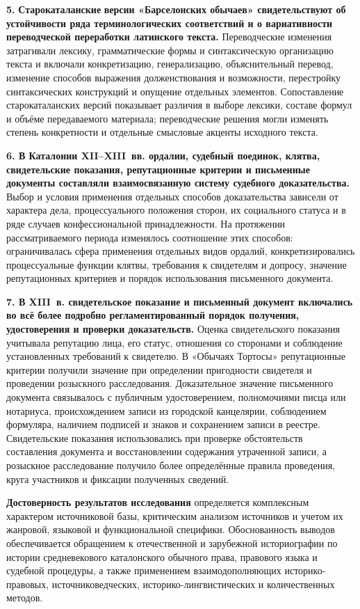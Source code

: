 \textbf{5. }\textbf{Старокаталанские}\textbf{ версии «Барселонских обычаев» свидетельствуют об устойчивости ряда терминологических соответствий и о вариативности переводческой переработки латинского текста. }Переводческие изменения затрагивали лексику, грамматические формы и синтаксическую организацию текста и включали конкретизацию, генерализацию, объяснительный перевод, изменение способов выражения долженствования и возможности, перестройку синтаксических конструкций и опущение отдельных элементов. Сопоставление старокаталанских версий показывает различия в выборе лексики, составе формул и объёме передаваемого материала; переводческие решения могли изменять степень конкретности и отдельные смысловые акценты исходного текста.

\textbf{6. В Каталонии XII--XIII~вв. ордалии, судебный поединок, клятва, свидетельские показания, репутационные критерии и письменные документы составляли взаимосвязанную систему судебного доказательства. }Выбор и условия применения отдельных способов доказательства зависели от характера дела, процессуального положения сторон, их социального статуса и в ряде случаев конфессиональной принадлежности. На протяжении рассматриваемого периода изменялось соотношение этих способов: ограничивалась сфера применения отдельных видов ордалий, конкретизировались процессуальные функции клятвы, требования к свидетелям и допросу, значение репутационных критериев и порядок использования письменного документа.

\textbf{7. В XIII~в. свидетельское показание и письменный документ включались во всё более подробно регламентированный порядок получения, удостоверения и проверки доказательств. }Оценка свидетельского показания учитывала репутацию лица, его статус, отношения со сторонами и соблюдение установленных требований к свидетелю. В «Обычаях Тортосы» репутационные критерии получили значение при определении пригодности свидетеля и проведении розыскного расследования. Доказательное значение письменного документа связывалось с публичным удостоверением, полномочиями писца или нотариуса, происхождением записи из городской канцелярии, соблюдением формуляра, наличием подписей и знаков и сохранением записи в реестре. Свидетельские показания использовались при проверке обстоятельств составления документа и восстановлении содержания утраченной записи, а розыскное расследование получило более определённые правила проведения, круга участников и фиксации полученных сведений.

\textbf{Достоверность результатов исследования }определяется комплексным характером источниковой базы, критическим анализом источников и учетом их жанровой, языковой и функциональной специфики. Обоснованность выводов обеспечивается обращением к отечественной и зарубежной историографии по истории средневекового каталонского обычного права, правового языка и судебной процедуры, а также применением взаимодополняющих историко-правовых, источниковедческих, историко-лингвистических и количественных методов.

